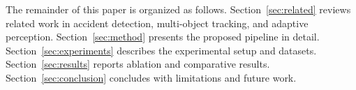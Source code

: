 The remainder of this paper is organized as follows.
Section~\ref{sec:related} reviews related work in accident detection,
multi-object tracking, and adaptive perception.
Section~\ref{sec:method} presents the proposed pipeline in detail.
Section~\ref{sec:experiments} describes the experimental setup and
datasets.
Section~\ref{sec:results} reports ablation and comparative results.
Section~\ref{sec:conclusion} concludes with limitations and future work.
